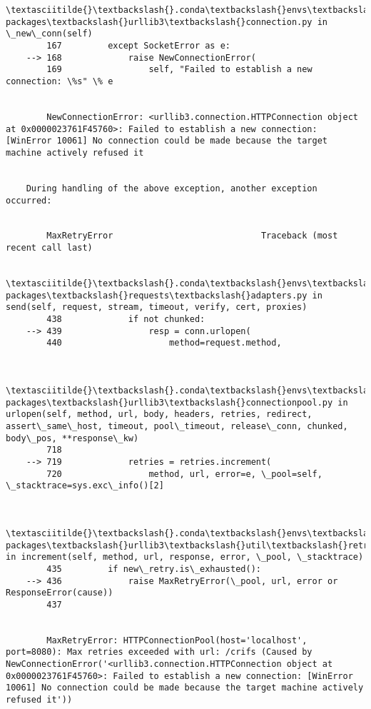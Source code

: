 \begin{Verbatim}[commandchars=\\\{\}]
        \textasciitilde{}\textbackslash{}.conda\textbackslash{}envs\textbackslash{}SACCRconda\textbackslash{}lib\textbackslash{}site-packages\textbackslash{}urllib3\textbackslash{}connection.py in \_new\_conn(self)
        167         except SocketError as e:
    --> 168             raise NewConnectionError(
        169                 self, "Failed to establish a new connection: \%s" \% e
    

        NewConnectionError: <urllib3.connection.HTTPConnection object at 0x0000023761F45760>: Failed to establish a new connection: [WinError 10061] No connection could be made because the target machine actively refused it

        
    During handling of the above exception, another exception occurred:
    

        MaxRetryError                             Traceback (most recent call last)

        \textasciitilde{}\textbackslash{}.conda\textbackslash{}envs\textbackslash{}SACCRconda\textbackslash{}lib\textbackslash{}site-packages\textbackslash{}requests\textbackslash{}adapters.py in send(self, request, stream, timeout, verify, cert, proxies)
        438             if not chunked:
    --> 439                 resp = conn.urlopen(
        440                     method=request.method,
    

        \textasciitilde{}\textbackslash{}.conda\textbackslash{}envs\textbackslash{}SACCRconda\textbackslash{}lib\textbackslash{}site-packages\textbackslash{}urllib3\textbackslash{}connectionpool.py in urlopen(self, method, url, body, headers, retries, redirect, assert\_same\_host, timeout, pool\_timeout, release\_conn, chunked, body\_pos, **response\_kw)
        718 
    --> 719             retries = retries.increment(
        720                 method, url, error=e, \_pool=self, \_stacktrace=sys.exc\_info()[2]
    

        \textasciitilde{}\textbackslash{}.conda\textbackslash{}envs\textbackslash{}SACCRconda\textbackslash{}lib\textbackslash{}site-packages\textbackslash{}urllib3\textbackslash{}util\textbackslash{}retry.py in increment(self, method, url, response, error, \_pool, \_stacktrace)
        435         if new\_retry.is\_exhausted():
    --> 436             raise MaxRetryError(\_pool, url, error or ResponseError(cause))
        437 
    

        MaxRetryError: HTTPConnectionPool(host='localhost', port=8080): Max retries exceeded with url: /crifs (Caused by NewConnectionError('<urllib3.connection.HTTPConnection object at 0x0000023761F45760>: Failed to establish a new connection: [WinError 10061] No connection could be made because the target machine actively refused it'))


\end{Verbatim}
